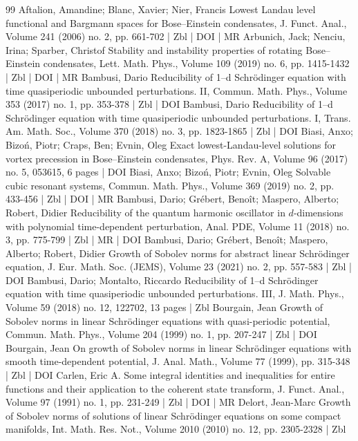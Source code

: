 \begin{thebibliography}{99}
Aftalion, Amandine; Blanc, Xavier; Nier, Francis Lowest Landau level functional and Bargmann spaces for Bose–Einstein condensates, J. Funct. Anal., Volume 241 (2006) no. 2, pp. 661-702 | Zbl | DOI | MR
Arbunich, Jack; Nenciu, Irina; Sparber, Christof Stability and instability properties of rotating Bose–Einstein condensates, Lett. Math. Phys., Volume 109 (2019) no. 6, pp. 1415-1432 | Zbl | DOI | MR
Bambusi, Dario Reducibility of 1--d Schrödinger equation with time quasiperiodic unbounded perturbations. II, Commun. Math. Phys., Volume 353 (2017) no. 1, pp. 353-378 | Zbl | DOI
Bambusi, Dario Reducibility of 1--d Schrödinger equation with time quasiperiodic unbounded perturbations. I, Trans. Am. Math. Soc., Volume 370 (2018) no. 3, pp. 1823-1865 | Zbl | DOI
Biasi, Anxo; Bizoń, Piotr; Craps, Ben; Evnin, Oleg Exact lowest-Landau-level solutions for vortex precession in Bose–Einstein condensates, Phys. Rev. A, Volume 96 (2017) no. 5, 053615, 6 pages | DOI
Biasi, Anxo; Bizoń, Piotr; Evnin, Oleg Solvable cubic resonant systems, Commun. Math. Phys., Volume 369 (2019) no. 2, pp. 433-456 | Zbl | DOI | MR
Bambusi, Dario; Grébert, Benoît; Maspero, Alberto; Robert, Didier Reducibility of the quantum harmonic oscillator in $d$-dimensions with polynomial time-dependent perturbation, Anal. PDE, Volume 11 (2018) no. 3, pp. 775-799 | Zbl | MR | DOI
Bambusi, Dario; Grébert, Benoît; Maspero, Alberto; Robert, Didier Growth of Sobolev norms for abstract linear Schrödinger equation, J. Eur. Math. Soc. (JEMS), Volume 23 (2021) no. 2, pp. 557-583 | Zbl | DOI
Bambusi, Dario; Montalto, Riccardo Reducibility of 1--d Schrödinger equation with time quasiperiodic unbounded perturbations. III, J. Math. Phys., Volume 59 (2018) no. 12, 122702, 13 pages | Zbl
Bourgain, Jean Growth of Sobolev norms in linear Schrödinger equations with quasi-periodic potential, Commun. Math. Phys., Volume 204 (1999) no. 1, pp. 207-247 | Zbl | DOI
Bourgain, Jean On growth of Sobolev norms in linear Schrödinger equations with smooth time-dependent potential, J. Anal. Math., Volume 77 (1999), pp. 315-348 | Zbl | DOI
Carlen, Eric A. Some integral identities and inequalities for entire functions and their application to the coherent state transform, J. Funct. Anal., Volume 97 (1991) no. 1, pp. 231-249 | Zbl | DOI | MR
Delort, Jean-Marc Growth of Sobolev norms of solutions of linear Schrödinger equations on some compact manifolds, Int. Math. Res. Not., Volume 2010 (2010) no. 12, pp. 2305-2328 | Zbl

\end{thebibliography}
